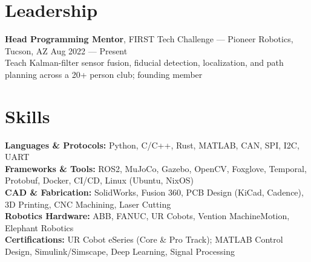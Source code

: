 \documentclass[10pt]{article}
\begin{document}
\section*{Leadership}
\textbf{Head Programming Mentor}, FIRST Tech Challenge --- Pioneer Robotics, Tucson, AZ \hfill Aug 2022 --- Present \\
Teach Kalman-filter sensor fusion, fiducial detection, localization, and path planning across a 20+ person club; founding member

\section*{Skills}
\textbf{Languages \& Protocols:} Python, C/C++, Rust, MATLAB, CAN, SPI, I2C, UART \\
\textbf{Frameworks \& Tools:} ROS2, MuJoCo, Gazebo, OpenCV, Foxglove, Temporal, Protobuf, Docker, CI/CD, Linux (Ubuntu, NixOS) \\
\textbf{CAD \& Fabrication:} SolidWorks, Fusion 360, PCB Design (KiCad, Cadence), 3D Printing, CNC Machining, Laser Cutting \\
\textbf{Robotics Hardware:} ABB, FANUC, UR Cobots, Vention MachineMotion, Elephant Robotics \\
\textbf{Certifications:} UR Cobot eSeries (Core \& Pro Track); MATLAB Control Design, Simulink/Simscape, Deep Learning, Signal Processing
\end{document}
